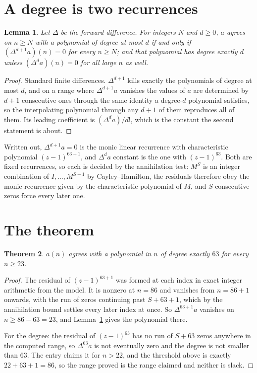 \documentclass[11pt,a4paper]{article}
\theoremstyle{plain}
\newtheorem{theorem}{Theorem}
\newtheorem{lemma}[theorem]{Lemma}
\theoremstyle{definition}
\begin{document}
\section{A degree is two recurrences}

\begin{lemma}\label{lem:diff}
Let $\Delta$ be the forward difference. For integers $N$ and $d\ge0$, $a$ agrees on
$n\ge N$ with a polynomial of degree at most $d$ if and only if $(\Delta^{d+1}a)(n)=0$ for
every $n\ge N$; and that polynomial has degree exactly $d$ unless $(\Delta^{d}a)(n)=0$ for
all large $n$ as well.
\end{lemma}

\begin{proof}
Standard finite differences. $\Delta^{d+1}$ kills exactly the polynomials of degree at most
$d$, and on a range where $\Delta^{d+1}a$ vanishes the values of $a$ are determined by
$d+1$ consecutive ones through the same identity a degree-$d$ polynomial satisfies, so the
interpolating polynomial through any $d+1$ of them reproduces all of them. Its leading
coefficient is $(\Delta^{d}a)/d!$, which is the constant the second statement is about.
\end{proof}

Written out, $\Delta^{d+1}a=0$ is the monic linear recurrence with characteristic polynomial
$(z-1)^{63+1}$, and $\Delta^{d}a$ constant is the one with $(z-1)^{63}$. Both are
fixed recurrences, so each is decided by the annihilation test: $M^{S}$ is an integer
combination of $I,\dots,M^{S-1}$ by Cayley--Hamilton, the residuals therefore obey the monic
recurrence given by the characteristic polynomial of $M$, and $S$ consecutive zeros force every
later one.

\section{The theorem}

\begin{theorem}
$a(n)$ agrees with a polynomial in $n$ of degree exactly $63$ for every $n\ge23$.
\end{theorem}

\begin{proof}
The residual of $(z-1)^{63+1}$ was formed at each index in exact integer arithmetic from
the model. It is nonzero at $n=86$ and vanishes from $n=86+1$ onwards, with the run of
zeros continuing past $S+63+1$, which by the annihilation bound settles every later index at
once. So $\Delta^{63+1}a$ vanishes on $n\ge86-63=23$, and
Lemma~\ref{lem:diff} gives the polynomial there.

For the degree: the residual of $(z-1)^{63}$ has no run of $S+63$ zeros anywhere in the
computed range, so $\Delta^{63}a$ is not eventually zero and the degree is not smaller
than $63$. The entry claims it for $n>22$, and the threshold above is exactly $22+63+1=86$, so the range proved is the range claimed and neither is slack.
\end{proof}
\end{document}
